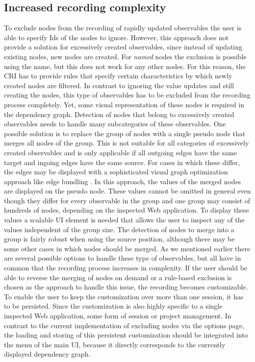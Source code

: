 \subsection{Increased recording complexity}
To exclude nodes from the recording of rapidly updated observables the user is able to specify Ids of the nodes to ignore. However, this approach does not provide a solution for excessively created observables, since instead of updating existing nodes, new nodes are created. For \emph{named} nodes the exclusion is possible using the name, but this does not work for any other nodes. For this reason, the CRI has to provide rules that specify certain characteristics by which newly created nodes are filtered. In contrast to ignoring the value updates and still creating the nodes, this type of observables has to be excluded from the recording process completely. Yet, some visual representation of these nodes is required in the dependency graph. Detection of nodes that belong to excessively created observables needs to handle many subcategories of these observables. One possible solution is to replace the group of nodes with a single pseudo node that merges all nodes of the group. This is not suitable for all categories of excessively created observables and is only applicable if all outgoing edges have the same target and ingoing edges have the same source. For cases in which these differ, the edges may be displayed with a sophisticated visual graph optimization approach like edge bundling \cite{EdgeBundling}. In this approach, the values of the merged nodes are displayed on the pseudo node. These values cannot be omitted in general even though they differ for every observable in the group and one group may consist of hundreds of nodes, depending on the inspected Web application. To display these values a scalable UI element is needed that allows the user to inspect any of the values independent of the group size. The detection of nodes to merge into a group is fairly robust when using the source position, although there may be some other cases in which nodes should be merged. As we mentioned earlier there are several possible options to handle these type of observables, but all have in common that the recording process increases in complexity. If the user should be able to reverse the merging of nodes on demand or a rule-based exclusion is chosen as the approach to handle this issue, the recording becomes customizable. To enable the user to keep the customization over more than one session, it has to be persisted. Since the customization is also highly specific to a single inspected Web application, some form of session or project management. In contrast to the current implementation of excluding nodes via the options page, the loading and storing of this persistent customization should be integrated into the menu of the main UI, because it directly corresponds to the currently displayed dependency graph.
	
